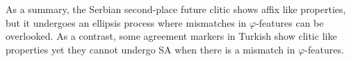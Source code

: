 As a summary, the Serbian second-place future clitic shows affix like properties, but it undergoes an ellipsis process where mismatches in $\varphi$-features can be overlooked. As a contrast, some agreement markers in Turkish show clitic like properties yet they cannot undergo SA when there is a mismatch in $\varphi$-features.

















